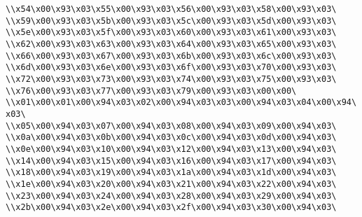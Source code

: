 \verb|\\x54\x00\x93\x03\x55\x00\x93\x03\x56\x00\x93\x03\x58\x00\x93\x03\|\newline
\verb|\\x59\x00\x93\x03\x5b\x00\x93\x03\x5c\x00\x93\x03\x5d\x00\x93\x03\|\newline
\verb|\\x5e\x00\x93\x03\x5f\x00\x93\x03\x60\x00\x93\x03\x61\x00\x93\x03\|\newline
\verb|\\x62\x00\x93\x03\x63\x00\x93\x03\x64\x00\x93\x03\x65\x00\x93\x03\|\newline
\verb|\\x66\x00\x93\x03\x67\x00\x93\x03\x6b\x00\x93\x03\x6c\x00\x93\x03\|\newline
\verb|\\x6d\x00\x93\x03\x6e\x00\x93\x03\x6f\x00\x93\x03\x70\x00\x93\x03\|\newline
\verb|\\x72\x00\x93\x03\x73\x00\x93\x03\x74\x00\x93\x03\x75\x00\x93\x03\|\newline
\verb|\\x76\x00\x93\x03\x77\x00\x93\x03\x79\x00\x93\x03\x00\x00\|\newline
\verb|\\x01\x00\x01\x00\x94\x03\x02\x00\x94\x03\x03\x00\x94\x03\x04\x00\x94\x03\|\newline
\verb|\\x05\x00\x94\x03\x07\x00\x94\x03\x08\x00\x94\x03\x09\x00\x94\x03\|\newline
\verb|\\x0a\x00\x94\x03\x0b\x00\x94\x03\x0c\x00\x94\x03\x0d\x00\x94\x03\|\newline
\verb|\\x0e\x00\x94\x03\x10\x00\x94\x03\x12\x00\x94\x03\x13\x00\x94\x03\|\newline
\verb|\\x14\x00\x94\x03\x15\x00\x94\x03\x16\x00\x94\x03\x17\x00\x94\x03\|\newline
\verb|\\x18\x00\x94\x03\x19\x00\x94\x03\x1a\x00\x94\x03\x1d\x00\x94\x03\|\newline
\verb|\\x1e\x00\x94\x03\x20\x00\x94\x03\x21\x00\x94\x03\x22\x00\x94\x03\|\newline
\verb|\\x23\x00\x94\x03\x24\x00\x94\x03\x28\x00\x94\x03\x29\x00\x94\x03\|\newline
\verb|\\x2b\x00\x94\x03\x2e\x00\x94\x03\x2f\x00\x94\x03\x30\x00\x94\x03\|\newline
